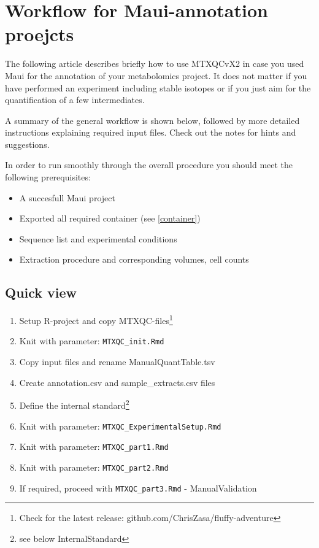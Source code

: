 \documentclass[]{book}
\providecommand{\tightlist}{%
  \setlength{\itemsep}{0pt}\setlength{\parskip}{0pt}}
\let\rmarkdownfootnote\footnote%
\def\footnote{\protect\rmarkdownfootnote}
\theoremstyle{definition}
\theoremstyle{definition}
\theoremstyle{definition}
\theoremstyle{remark}
\begin{document}
\chapter{Workflow for Maui-annotation proejcts}\label{maui}

The following article describes briefly how to use MTXQCvX2 in case you
used Maui for the annotation of your metabolomics project. It does not
matter if you have performed an experiment including stable isotopes or
if you just aim for the quantification of a few intermediates.

A summary of the general workflow is shown below, followed by more
detailed instructions explaining required input files. Check out the
notes for hints and suggestions.

In order to run smoothly through the overall procedure you should meet
the following prerequisites:

\begin{itemize}
\tightlist
\item
  A succesfull Maui project
\item
  Exported all required container (see \ref{container})
\item
  Sequence list and experimental conditions
\item
  Extraction procedure and corresponding volumes, cell counts
\end{itemize}

\section{Quick view}\label{quick-view}

\begin{enumerate}
\def\labelenumi{\arabic{enumi}.}
\tightlist
\item
  Setup R-project and copy MTXQC-files\footnote{Check for the latest
    release: github.com/ChrisZasa/fluffy-adventure}
\item
  Knit with parameter: \texttt{MTXQC\_init.Rmd}
\item
  Copy input files and rename ManualQuantTable.tsv
\item
  Create annotation.csv and sample\_extracts.csv files
\item
  Define the internal standard\footnote{see below InternalStandard}
\item
  Knit with parameter: \texttt{MTXQC\_ExperimentalSetup.Rmd}
\item
  Knit with parameter: \texttt{MTXQC\_part1.Rmd}
\item
  Knit with parameter: \texttt{MTXQC\_part2.Rmd}
\item
  If required, proceed with \texttt{MTXQC\_part3.Rmd} - ManualValidation
\end{enumerate}
\end{document}
